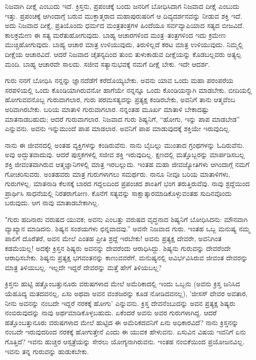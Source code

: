 ನಿಜವಾಗಿ ದೀಕ್ಷೆ ಎಂಬುದು ಇದೆ. ಕ್ರಿಸ್ತನು, ಪ್ರಪಂಚಕ್ಕೆ ಬಂದು ಜನರಿಗೆ ಬೋಧಿಸಿದಾಗ ನಿಜವಾದ ದೀಕ್ಷೆ ಎಂಬುದು ಇತ್ತು. ಪ್ರಪಂಚಕ್ಕೆ ಆಗಿಂದಾಗ್ಗೆ ಬರುವ ಮುಕ್ತಾತ್ಮರಾದ ಮಹಾಪುರುಷರಿಗೆ ಆ ದಿವ್ಯದರ್ಶನವನ್ನು ನೀಡುವ ಶಕ್ತಿ ಇದೆ. ಅದು ನಿಜವಾದ ದೀಕ್ಷೆ, ಪ್ರತಿಯೊಂದು ಧರ್ಮದ ಮಂತ್ರತಂತ್ರಗಳ ಹಿಂದೆಯೂ ಸರ್ವವ್ಯಾಪಿಯಾದ ಸತ್ಯದ ಬೀಜವಿದೆ. ಕಾಲಕ್ರಮೇಣ ಈ ಸತ್ಯ ಮರೆತುಹೋಗುವುದು. ಬಾಹ್ಯ ಆಚಾರಗಳಿಂದ ಮಂತ್ರ–ತಂತ್ರಗಳಿಂದ ಇದು ಕ್ರಮೇಣ ಮುಚ್ಚಿಹೋಗುವುದು. ಬಾಹ್ಯ ಆಚಾರ ಮಾತ್ರ ಉಳಿಯುವುದು, ತಿರುಳಿಲ್ಲದೆ ಕರಟ ಮಾತ್ರ ಉಳಿಯುವುದು. ನಿಮ್ಮಲ್ಲಿ ದೀಕ್ಷೆಯ ಆಚಾರವಿದೆ. ಆದರೆ ನಿಜವಾದ ಚೈತನ್ಯದಿಂದ ತುಂಬಿ ತುಳುಕಾಡುವ ದೀಕ್ಷೆಯನ್ನು ಕೊಡಬಲ್ಲವರು ಅತ್ಯಲ್ಪ ಮಂದಿ. ಬಾಹ್ಯ ಆಚಾರವೇ ಸಾಲದು. ಸಜೀವ ಸತ್ಯಾನುಭವಕ್ಕೆ ನಮಗೆ ದೀಕ್ಷೆ ಬೇಕು. ಇದೇ ಆದರ್ಶ.

ಗುರು ನನಗೆ ಬೋಧಿಸಿ ನನ್ನನ್ನು ಜ್ಞಾನದೆಡೆಗೆ ಕರೆದೊಯ್ಯಬೇಕು. ಅವನು ಯಾವ ಒಂದು ಮಹಾ ಪರಂಪರೆಯ ಸರಪಳಿಯಲ್ಲಿ ಒಂದು ಕೊಂಡಿಯಾಗಿರುವನೋ ಹಾಗೆಯೇ ನನ್ನನ್ನೂ ಒಂದು ಕೊಂಡಿಯನ್ನಾಗಿ ಮಾಡಬೇಕು. ಬೀದಿಯಲ್ಲಿ ಹೋಗುವವನೊಬ್ಬ ಗುರುವಾಗಲಾರ, ಗುರು ಪರಮಸತ್ಯವನ್ನು ಪ್ರತ್ಯಕ್ಷ ಕಂಡಿರಬೇಕು, ಅವನಿಗೆ ತಾನು ಆತ್ಮವೆಂಬ ಅರಿವಾಗಿರಬೇಕು. ಬರಿಯ ಮಾತಾಳಿ ಗುರುವಾಗಲಾರ. ನನ್ನಂತಹ ಮೂರ್ಖ ಮಾತಾಳಿ ಬೇಕಾದಷ್ಟು ಮಾತನಾಡಬಹುದು; ಆದರೆ ಗುರುವಾಗಲಾರ. ನಿಜವಾದ ಗುರು ಶಿಷ್ಯನಿಗೆ, “ಹೋಗು, ಇನ್ನು ಪಾಪ ಮಾಡಬೇಡ'' ಎನ್ನುವನು. ಅವನು ಇನ್ನುಮುಂದೆ ಪಾಪ ಮಾಡಲಾರ. ಅವನಿಗೆ ಪಾಪ ಮಾಡುವುದಕ್ಕೆ ಶಕ್ತಿಯೇ ಇರುವುದಿಲ್ಲ.

ನಾನು ಈ ಜೀವನದಲ್ಲಿ ಅಂತಹ ವ್ಯಕ್ತಿಗಳನ್ನು ಕಂಡಿರುವೆನು. ನಾನು ಬೈಬಲ್ಲು ಮುಂತಾದ ಗ್ರಂಥಗಳನ್ನು ಓದಿರುವೆನು. ಅವು ಅದ್ಭುತವಾದುವು. ಆದರೆ ಪುಸ್ತಕಗಳಲ್ಲಿ ಸಜೀವ ಶಕ್ತಿ ಇರುವುದಿಲ್ಲ. ಕ್ಷಣದಲ್ಲಿ ಮತ್ತೊಬ್ಬರನ್ನು ಮಾರ್ಪಡಿಸಬಲ್ಲ ಶಕ್ತಿ ಜೀವಂತವಾಗಿರುವ ಆತ್ಮಜ್ಞಾನಿಗಳಲ್ಲಿ ಮಾತ್ರ ಇರಬಲ್ಲುದು. ಇಂತಹ ಮಹಾ ಜೀವಜ್ಯೋತಿಗಳು ಆಗಿಂದಾಗ್ಗೆ ನಮಗೆ ಗೋಚರಿಸುವರು. ಅಂತಹವರು ಮಾತ್ರ ಗುರುಗಳಾಗಲು ಸಮರ್ಥರು. ನಾನೂ ನೀವೂ ಬರಿಯ ಮಾತಾಳಿಗಳು, ಗುರುಗಳಲ್ಲ. ಮಾತನಾಡಿ ಕೆಲಸಕ್ಕೆ ಬಾರದ ಗದ್ದಲದಿಂದ ಪ್ರಪಂಚದ ಶಾಂತಿಗೆ ಭಂಗ ತರುತ್ತಿರುವೆವು. ನಾವು ಶ್ರದ್ದೆಯಿಂದ ಪ್ರಾರ್ಥಿಸಿ ಸಾಧನೆಯಲ್ಲಿ ನಿರತರಾಗೋಣ. ಕೊನೆಗೆ ಸತ್ಯವನ್ನು ಸಾಕ್ಷಾತ್ಕಾರಮಾಡಿಕೊಳ್ಳುವಂತಹ ಸುದಿನವೊಂದು ಬರುವುದು. ಆಗ ನಾವು ಮಾತಾಡಬೇಕಾಗಿಲ್ಲ.

"ಗುರು ಹದಿನಾರು ವರುಷದ ಯುವಕ; ಅವನು ಎಂಬತ್ತು ವರುಷದ ವೃದ್ಧನಾದ ಶಿಷ್ಯನಿಗೆ ಬೋಧಿಸಿದನು: ಮೌನವಾಗಿ ವ್ಯಾಖ್ಯಾನ ಮಾಡಿದನು. ಶಿಷ್ಯನ ಸಂಶಯಗಳು ಛಿನ್ನವಾದವು.” ಅವನೇ ನಿಜವಾದ ಗುರು. ಇಂತಹ ಒಬ್ಬ ಮನುಷ್ಯ ನಮ್ಮ ಪಾಲಿಗೆ ದೊರೆತರೆ, ಅವನ ಮೇಲೆ ಎಂತಹ ಪ್ರೀತಿ ಶ್ರದ್ದೆ ಇರಬೇಕು! ಅವನು ಪ್ರತ್ಯಕ್ಷ ದೇವರೇ, ಅವನಿಗಿಂತ ಕಡಮೆಯಲ್ಲ! ಅದಕ್ಕೇ ಕ್ರಿಸ್ತನ ಶಿಷ್ಯರು ಅವನನ್ನು ದೇವರೆಂದು ಆರಾಧಿಸಿದ್ದು. ಶಿಷ್ಯನು ಗುರುವನ್ನು ದೇವರೆಂದೇ ಆರಾಧಿಸಬೇಕು. ಶಿಷ್ಯನು ಪ್ರತ್ಯಕ್ಷ ಭಗವಂತನನ್ನು ಕಾಣುವವರೆಗೆ, ಮನುಷ್ಯನಲ್ಲಿ ಆವಿರ್ಭವಿಸಿರುವ ಜೀವಂತ ದೇವರನ್ನು ಮಾತ್ರ ತಿಳಿಯಬಲ್ಲ. ಇಲ್ಲದೇ ಇದ್ದರೆ ದೇವರನ್ನು ಮತ್ತೆ ಹೇಗೆ ತಿಳಿಯಬಲ್ಲ?

ಕ್ರಿಸ್ತನು ಹುಟ್ಟಿ ಹತ್ತೊಂಬತ್ತುನೂರು ವರುಷಗಳಾದ ಮೇಲೆ ಅಮೆರಿಕಾದಲ್ಲಿ ಇಂದು ಒಬ್ಬನು (ಅವನು ಕ್ರಿಸ್ತ ಜನಿಸಿದ ಯೆಹೂದ್ಯ ಮತದವನಲ್ಲ, ಏಸು ಅಥವಾ ಅವನ ವಂಶಜರನ್ನು ಕೂಡ ನೋಡಿದವನಲ್ಲ), 'ಜೀಸಸ್ ದೇವರ ಅವತಾರ, ನೀನು ಅವನನ್ನು ನಂಬದೇ ಇದ್ದರೆ ನರಕಕ್ಕೆ ಹೋಗು' ಎನ್ನುವನು. ಕ್ರಿಸ್ತ ದೇವನೆಂಬುದನ್ನು ಅವನ ಪ್ರತ್ಯಕ್ಷ ಶಿಷ್ಯರು ನಂಬಿರುವುದನ್ನು ನಾವು ಅರ್ಥಮಾಡಿಕೊಳ್ಳಬಹುದು. ಏಕೆಂದರೆ ಅವನು ಅವರ ಗುರುಗಳಾಗಿದ್ದ. ಆದರೆ ಹತ್ತೊಂಬತ್ತುನೂರು ವರುಷಗಳಾದ ಮೇಲೆ ಹುಟ್ಟಿದ ಈ ಅಮೆರಿಕದವನಿಗೆ ಏನು ಅಧಿಕಾರವಿದೆ? ನಾನು ಕ್ರಿಸ್ತನನ್ನು ನಂಬದೇ ಇರುವುದರಿಂದ ನರಕಕ್ಕೆ ಹೋಗುತ್ತೇನೆ ಎಂದು ಈ ಯುವಕ ಹೇಳುವನು. ಏಸುವಿನ ವಿಷಯ ಇವನಿಗೆ ಏನು ಗೊತ್ತಿದೆ? ಇವನು ಹುಚ್ಚರ ಆಸ್ಪತ್ರೆಯನ್ನು ಸೇರಲು ಯೋಗ್ಯನಾಗಿರುವನು. ಇಂತಹ ನಂಬಿಕೆಯಿಂದ ಪ್ರಯೋಜನವಿಲ್ಲ. ಇವನು ತನ್ನ ಗುರುವನ್ನು ಹುಡುಕಬೇಕು.


